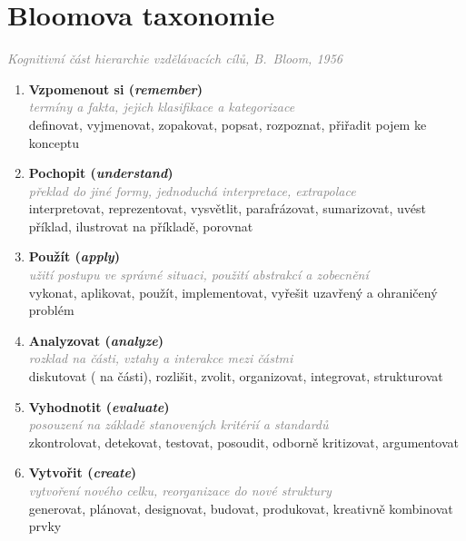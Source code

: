 \documentclass[twoside,openany,10pt]{book}
\newcommand{\note}[1]{\textcolor{gray}{\small\itshape #1}}
\begin{document}
\chapter*{Bloomova taxonomie}
\label{bloom}
\vspace{-0.5em}
\note{Kognitivní část hierarchie vzdělávacích cílů, B.\ Bloom, 1956}
\vspace{-0.3em}

\begin{enumerate}[leftmargin=*]
\item \textbf{Vzpomenout si (\textit{remember})}\\
\note{termíny a fakta, jejich klasifikace a kategorizace}\\
{\small definovat, vyjmenovat, zopakovat, popsat, rozpoznat, přiřadit pojem ke konceptu}

\item \textbf{Pochopit (\textit{understand})}\\
\note{překlad do jiné formy, jednoduchá interpretace, extrapolace}\\
{\small interpretovat, reprezentovat, vysvětlit, parafrázovat, sumarizovat, uvést příklad, ilustrovat na příkladě, porovnat}

\item \textbf{Použít (\textit{apply})}\\
\note{užití postupu ve správné situaci, použití abstrakcí a zobecnění}\\
{\small vykonat, aplikovat, použít, implementovat, vyřešit uzavřený a ohraničený problém}

\item \textbf{Analyzovat (\textit{analyze})}\\
\note{rozklad na části, vztahy a interakce mezi částmi}\\
{\small diskutovat ( na části), rozlišit, zvolit, organizovat, integrovat, strukturovat}

\item \textbf{Vyhodnotit (\textit{evaluate})}\\
\note{posouzení na základě stanovených kritérií a standardů}\\
{\small zkontrolovat, detekovat, testovat, posoudit, odborně kritizovat, argumentovat}

\item \textbf{Vytvořit (\textit{create})}\\
\note{vytvoření nového celku, reorganizace do nové struktury}\\
{\small generovat, plánovat, designovat, budovat, produkovat, kreativně kombinovat prvky}
\end{enumerate}
\end{document}
